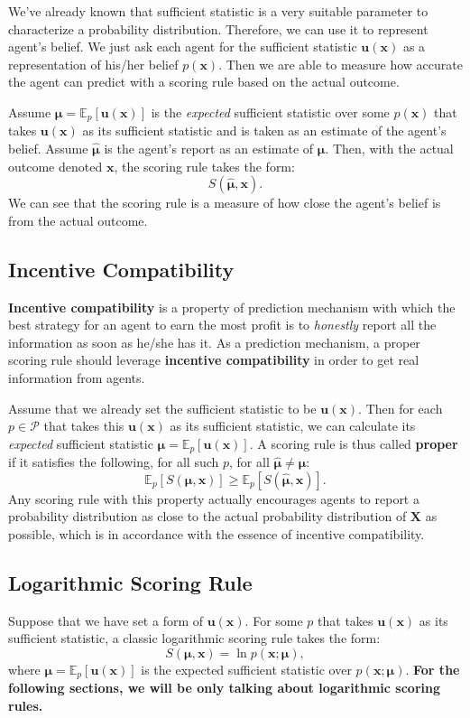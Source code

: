 \documentclass[12pt]{article}
\begin{document}
We've already known that sufficient statistic is a very suitable parameter to characterize a probability distribution. Therefore, we can use it to represent agent's belief. We just ask each agent for the sufficient statistic $\mathbf{u}(\mathbf{x})$ as a representation of his/her belief $p(\mathbf{x})$. Then we are able to measure how accurate the agent can predict with a scoring rule based on the actual outcome.

Assume $\bm{\mu}=\mathbb{E}_p[\mathbf{u}(\mathbf{x})]$ is the \textit{expected} sufficient statistic over some $p(\mathbf{x})$ that takes $\mathbf{u}(\mathbf{x})$ as its sufficient statistic and is taken as an estimate of the agent's belief. Assume $\bm{\hat{\mu}}$ is the agent's report as an estimate of $\bm{\mu}$. Then, with the actual outcome denoted $\mathbf{x}$, the scoring rule takes the form:
\[S(\bm{\hat{\mu}},\mathbf{x}).\]
We can see that the scoring rule is a measure of how close the agent's belief is from the actual outcome.

\subsection{Incentive Compatibility}
\textbf{Incentive compatibility} is a property of prediction mechanism with which the best strategy for an agent to earn the most profit is to \textit{honestly} report all the information as soon as he/she has it. As a prediction mechanism, a proper scoring rule should leverage \textbf{incentive compatibility} in order to get real information from agents.

Assume that we already set the sufficient statistic to be $\mathbf{u}(\mathbf{x})$. Then for each $p\in \mathcal{P}$ that takes this $\mathbf{u}(\mathbf{x})$ as its sufficient statistic, we can calculate its \textit{expected} sufficient statistic $\bm{\mu}=\mathbb{E}_p[\mathbf{u}(\mathbf{x})]$. A scoring rule is thus called \textbf{proper} if it satisfies the following, for all such $p$, for all $\bm{\hat{\mu}}\neq\bm{\mu}$:
\[\mathbb{E}_p[S(\bm{\mu},\mathbf{x})]\geqslant \mathbb{E}_p[S(\bm{\hat{\mu}},\mathbf{x})].\]
Any scoring rule with this property actually encourages agents to report a probability distribution as close to the actual probability distribution of $\mathbf{X}$ as possible, which is in accordance with the essence of incentive compatibility.

\subsection{Logarithmic Scoring Rule}
Suppose that we have set a form of $\mathbf{u}(\mathbf{x})$. For some $p$ that takes $\mathbf{u}(\mathbf{x})$ as its sufficient statistic, a classic logarithmic scoring rule takes the form:
\[S(\bm{\mu},\mathbf{x})=\ln p(\mathbf{x};\bm{\mu}),\]
where $\bm{\mu}=\mathbb{E}_p[\mathbf{u}(\mathbf{x})]$ is the expected sufficient statistic over $p(\mathbf{x};\bm{\mu})$. \textbf{For the following sections, we will be only talking about logarithmic scoring rules.}
\end{document}
